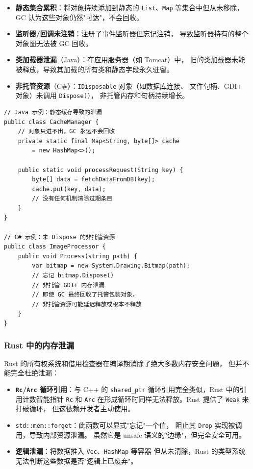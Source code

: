 \documentclass[12pt,a4paper,fontset=fandol]{ctexbook}
\begin{document}
\begin{itemize}[nosep]
  \item \textbf{静态集合累积}：将对象持续添加到静态的 \texttt{List}、\texttt{Map}
    等集合中但从未移除，GC 认为这些对象仍然"可达"，不会回收。
  \item \textbf{监听器/回调未注销}：注册了事件监听器但忘记注销，
    导致监听器持有的整个对象图无法被 GC 回收。
  \item \textbf{类加载器泄漏}（Java）：在应用服务器（如 Tomcat）中，
    旧的类加载器未能被释放，导致其加载的所有类和静态字段永久驻留。
  \item \textbf{非托管资源}（C\#）：\texttt{IDisposable} 对象（如数据库连接、
    文件句柄、GDI+ 对象）未调用 \texttt{Dispose()}，
    非托管内存和句柄持续增长。
\end{itemize}

\begin{lstlisting}[style=cppstyle, caption={Java 中的内存泄漏模式}]
// Java 示例：静态缓存导致的泄漏
public class CacheManager {
    // 对象只进不出，GC 永远不会回收
    private static final Map<String, byte[]> cache
        = new HashMap<>();

    public static void processRequest(String key) {
        byte[] data = fetchDataFromDB(key);
        cache.put(key, data);
        // 没有任何机制清除过期条目
    }
}

// C# 示例：未 Dispose 的非托管资源
public class ImageProcessor {
    public void Process(string path) {
        var bitmap = new System.Drawing.Bitmap(path);
        // 忘记 bitmap.Dispose()
        // 非托管 GDI+ 内存泄漏
        // 即使 GC 最终回收了托管包装对象，
        // 非托管资源可能延迟释放或根本不释放
    }
}
\end{lstlisting}

\subsubsection*{Rust 中的内存泄漏}

Rust 的所有权系统和借用检查器在编译期消除了绝大多数内存安全问题，
但并不能完全杜绝泄漏：

\begin{itemize}[nosep]
  \item \textbf{\texttt{Rc}/\allowbreak{}\texttt{Arc} 循环引用}：与 C++ 的 \texttt{shared\_ptr}
    循环引用完全类似，Rust 中的引用计数智能指针 \texttt{Rc} 和 \texttt{Arc}
    在形成循环时同样无法释放。Rust 提供了 \texttt{Weak} 来打破循环，
    但这依赖开发者主动使用。
  \item \texttt{std::mem::forget}：此函数可以显式"忘记"一个值，
    阻止其 \texttt{Drop} 实现被调用，导致内部资源泄漏。
    虽然它是 unsafe 语义的"边缘"，但完全安全可用。
  \item \textbf{逻辑泄漏}：将数据推入 \texttt{Vec}、\texttt{HashMap} 等容器
    但从未清除，Rust 的类型系统无法判断这些数据是否"逻辑上已废弃"。
\end{itemize}
\end{document}
